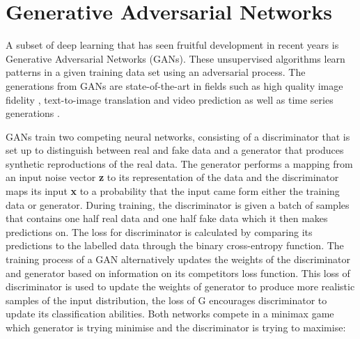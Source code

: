 \documentclass[12pt]{iopart}
\begin{document}
\section{Generative Adversarial Networks}

A subset of deep learning that has seen fruitful development in recent years \cite{Goodfellow2014} is Generative Adversarial Networks (GANs). These unsupervised algorithms learn patterns in a given training data set using an adversarial process. The generations from GANs are state-of-the-art in fields such as high quality image fidelity \cite{brock2018large,karras2019analyzing}, text-to-image translation \cite{reed2016generative} and video prediction \cite{liang2017dual} as well as time series generations \cite{esteban2017realvalued}. 

GANs train two competing neural networks, consisting of a discriminator that is set up to distinguish between real and fake data and a generator that produces synthetic
reproductions of the real data. The generator performs a mapping
from an input noise vector \textbf{z} to its representation of the data and the discriminator  maps its
input \textbf{x} to a probability that the input came form either the training
data or generator.  During training, the discriminator is given a batch of samples that contains one half real data
and one half fake data which it then makes predictions on. The
loss for discriminator  is calculated by comparing its predictions to the labelled data through the binary cross-entropy function. The training process
of a GAN alternatively updates the weights of the discriminator  and generator based on information
on its competitors loss function. This loss of discriminator  is used to update the weights
of generator to produce more realistic samples of the input distribution, the loss of G
encourages discriminator  to update its classification abilities. Both networks compete
in a minimax game which generator is trying
minimise and the discriminator is trying to maximise:
\end{document}
